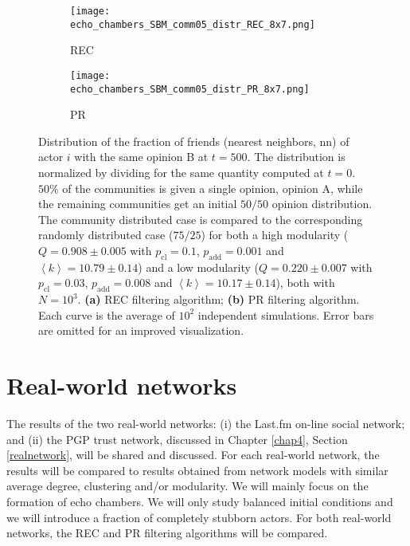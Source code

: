 \documentclass[11 pt , letterpaper , twoside , openright]{book}
\begin{document}
\begin{figure}[H]
  \begin{subfigure}[b]{0.49\textwidth}
    \caption{REC}
  	\texttt{[image: echo\_chambers\_SBM\_comm05\_distr\_REC\_8x7.png]}
    \label{rec_comm05_echo}
  \end{subfigure}
  \begin{subfigure}[b]{0.49\textwidth}
    \caption{PR}
  	\texttt{[image: echo\_chambers\_SBM\_comm05\_distr\_PR\_8x7.png]}
    \label{pr_comm05_echo}
  \end{subfigure}
  \captionsetup{format=plain}
  \caption[Distribution of the fraction of friends (nearest neighbors, nn) of actor $i$ with the same opinion B at $t = 500$. $50 \%$ of the communities is given a single opinion, opinion A, while the remaining communities get an initial $50/50$ opinion distribution. The community distributed case is compared to the corresponding randomly distributed case ($75/25$) for both a high modularity and a low modularity network. Results for the REC and PR filtering algorithms.]{Distribution of the fraction of friends (nearest neighbors, nn) of actor $i$ with the same opinion B at $t = 500$. The distribution is normalized by dividing for the same quantity computed at $t=0$. $50 \%$ of the communities is given a single opinion, opinion A, while the remaining communities get an initial $50/50$ opinion distribution. The community distributed case is compared to the corresponding randomly distributed case ($75/25$) for both a high modularity ($Q = 0.908 \pm 0.005$ with $p_{\text{cl}} = 0.1$, $p_{\text{add}} = 0.001$ and $\left<k\right> = 10.79 \pm 0.14$) and a low modularity ($Q = 0.220 \pm 0.007$ with $p_{\text{cl}} = 0.03$, $p_{\text{add}} = 0.008$ and $\left<k\right> = 10.17 \pm 0.14$), both with $N=10^3$. \textbf{(a)} REC filtering algorithm; \textbf{(b)} PR filtering algorithm. Each curve is the average of $10^2$ independent simulations. Error bars are omitted for an improved visualization.}
\label{echo_05_commOp0_other_50-50}
\end{figure}

\newpage
\section{Real-world networks}

The results of the two real-world networks: (i) the Last.fm on-line social network; and (ii) the PGP trust network, discussed in Chapter \ref{chap4}, Section \ref{realnetwork}, will be shared and discussed. For each real-world network, the results will be compared to results obtained from network models with similar average degree, clustering and/or modularity. We will mainly focus on the formation of echo chambers. We will only study balanced initial conditions and we will introduce a fraction of completely stubborn actors. For both real-world networks, the REC and PR filtering algorithms will be compared.
\end{document}
